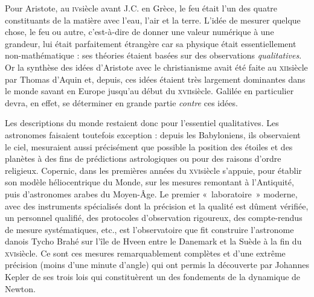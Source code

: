 \atstartofhistorysection
{}
\label{ch_histoire_degre_chaleur_depondt}


	Pour Aristote, au \textsc{iv}\ieme siècle avant J.C. en Grèce, le feu était l'un des quatre constituants de la matière avec l'eau, l'air et la terre. L'idée de mesurer quelque chose, le feu ou autre, c'est-à-dire de donner une valeur numérique à une grandeur, lui était parfaitement étrangère car sa physique était essentiellement non-mathématique\cite{koyre1966} : ses théories étaient basées sur des observations \emph{qualitatives}. Or la synthèse des idées d'Aristote avec le christianisme avait été faite au \textsc{xii}\ieme siècle par Thomas d'Aquin et, depuis, ces idées étaient très largement dominantes dans le monde savant en Europe jusqu'au début du \textsc{xvii}\ieme siècle. Galilée en particulier devra, en effet, se déterminer en grande partie \emph{contre} ces idées.
	
	Les descriptions du monde restaient donc pour l'essentiel qualitatives. Les astronomes faisaient toutefois exception : depuis les Babyloniens, ils observaient le ciel, mesuraient aussi précisément que possible la position des étoiles et des planètes à des fins de prédictions astrologiques ou pour des raisons d'ordre religieux. Copernic, dans les premières années du \textsc{xvi}\ieme siècle s'appuie, pour établir son modèle héliocentrique du Monde, sur les mesures remontant à l'Antiquité, puis d'astronomes arabes du Moyen-Âge. Le premier «~laboratoire~» moderne, avec des instruments spécialisés dont la précision et la qualité est dûment vérifiée, un personnel qualifié, des protocoles d'observation rigoureux, des compte-rendus de mesure systématiques, etc., est l'observatoire que fit construire l'astronome danois Tycho Brahé sur l'île de Hveen entre le Danemark et la Suède à la fin du \textsc{xvi}\ieme siècle. Ce sont ces mesures remarquablement complètes et d'une extrême précision (moins d'une minute d'angle) qui ont permis la découverte par Johannes Kepler de ses trois lois qui constituèrent un des fondements de la dynamique de Newton.
	
